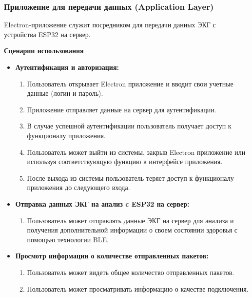 \documentclass[12pt, russian]{extarticle}
\begin{document}
\begin{spacing}{1.5}
\subsubsection{Приложение для передачи данных (Application Layer)}

Electron-приложение служит посредником для передачи данных ЭКГ с устройства ESP32 на сервер. 

\par \noindent \textbf{Сценарии использования}

\begin{itemize}
    \item \textbf{Аутентификация и авторизация:} \\
        \begin{enumerate}
            \item Пользователь открывает Electron приложение и вводит свои учетные данные (логин и пароль).
            \item Приложение отправляет данные на сервер для аутентификации.
            \item В случае успешной аутентификации пользователь получает доступ к функционалу приложения.
            \item Пользователь может выйти из системы, закрыв Electron приложение или используя соответствующую функцию в интерфейсе приложения.
            \item После выхода из системы пользователь теряет доступ к функционалу приложения до следующего входа.
        \end{enumerate}
    \item \textbf{Отправка данных ЭКГ на анализ c ESP32 на сервер:} \\
        \begin{enumerate}
            \item Пользователь может отправлять данные ЭКГ на сервер для анализа и получения дополнительной информации о своем состоянии здоровья с помощью технологии BLE.
        \end{enumerate}
    \item \textbf{Просмотр информации о количестве отправленных пакетов:} \\
        \begin{enumerate}
            \item Пользователь может видеть общее количество отправленных пакетов.
            \item Пользователь может просматривать информацию о качестве подключения.
        \end{enumerate}
\end{itemize}


\end{spacing}
\end{document}
